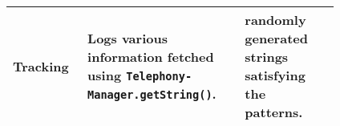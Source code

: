 \begin{table}[htbp]
{\begin{center}
\begin{tabular}{|>{\centering}m{0.15\linewidth}|m{0.4\linewidth}|m{0.26\linewidth}|}
                \hline
                Tracking & Logs various information fetched using \texttt{Telephony- Manager.getString()}. & randomly generated strings satisfying the patterns.  \\
                \hline
            \end{tabular}
    \end{center}
    }
    \label{tab:benchmarking_strategy}
\end{table}